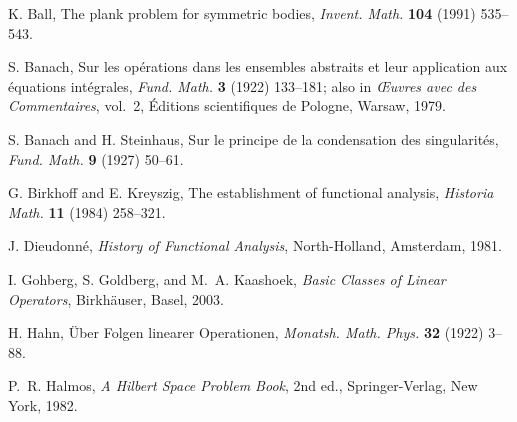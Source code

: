 \documentclass[12pt]{article}
\begin{document}
\begin{thebibliography}{199}

  K. Ball, The plank problem for symmetric bodies,
   {\em Invent. Math.}\/ {\bf 104} (1991) 535--543.

  S. Banach, Sur les op\'erations dans les ensembles
   abstraits et leur application aux \'equations int\'egrales,
  {\em  Fund. Math.}\/ {\bf 3} (1922) 133--181;
   also in {\em \OE{}uvres avec des Commentaires}\/,
   vol.~2,
   \'Editions scientifiques de Pologne, Warsaw, 1979. %

  S. Banach and H. Steinhaus, Sur le principe de la
   condensation des singularit\'es, {\em Fund. Math.}\/ {\bf 9} (1927) 50--61.

  G. Birkhoff and E. Kreyszig,
   The establishment of functional analysis,
   {\em Historia Math.}\/ {\bf 11} (1984) 258--321.


  J. Dieudonn\'e, {\em History of Functional Analysis}\/,
   North-Holland, Amsterdam, 1981.


  I. Gohberg, S. Goldberg, and M.~A. Kaashoek,
  {\em Basic Classes of Linear Operators}\/, Birkh\"auser, Basel, 2003.

  H. Hahn, \"Uber Folgen linearer Operationen,
   {\em Monatsh. Math. Phys.}\/ {\bf 32} (1922) 3--88.

  P.~R. Halmos, {\em A Hilbert Space Problem Book}\/,
   2nd ed., Springer-Verlag, New York, 1982.


\end{thebibliography}
\end{document}
